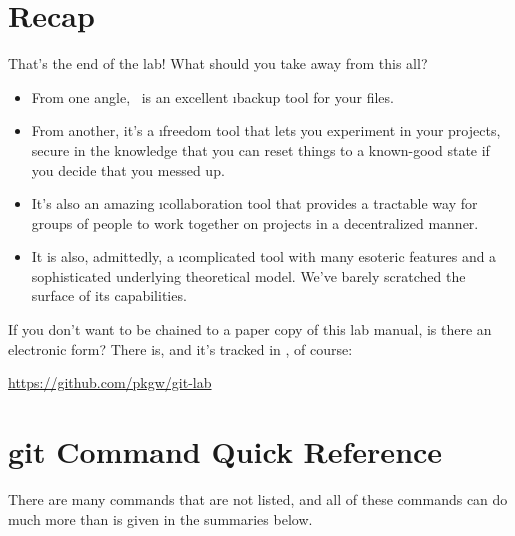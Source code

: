 \documentclass[letterpaper,12pt,titlepage,twoside]{article}
\begin{document}
\section*{Recap}

That's the end of the lab! What should you take away from this all?

\begin{itemize}
\item From one angle, \git\ is an excellent \i{backup tool} for your files.
\item From another, it's a \i{freedom tool} that lets you experiment in your
  projects, secure in the knowledge that you can reset things to a known-good
  state if you decide that you messed up.
\item It's also an amazing \i{collaboration tool} that provides a tractable
  way for groups of people to work together on projects in a decentralized
  manner.
\item It is also, admittedly, a \i{complicated tool} with many esoteric
  features and a sophisticated underlying theoretical model. We've barely
  scratched the surface of its capabilities.
\end{itemize}

If you don't want to be chained to a paper copy of this lab manual, is there
an electronic form? There is, and it's tracked in \git, of course:

\bigskip
{\large\centering\url{https://github.com/pkgw/git-lab}\par}


\section*{git Command Quick Reference}

There are many commands that are not listed, and all of these commands can do
much more than is given in the summaries below.
\end{document}
